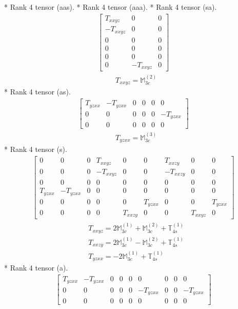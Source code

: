 \documentclass[fleqn,8pt,landscape]{jsarticle}
\begin{document}
* Rank 4 tensor (aas).
* Rank 4 tensor (aaa).
* Rank 4 tensor (sa).
\begin{align*}
\begin{bmatrix} T_{xxyz} & 0 & 0 \\ - T_{xxyz} & 0 & 0 \\ 0 & 0 & 0 \\ 0 & 0 & 0 \\ 0 & 0 & 0 \\ 0 & - T_{xxyz} & 0 \end{bmatrix}
\end{align*}
\begin{align*}
& T_{xxyz} = \mathbb{M}_{3c}^{(2)}
\end{align*}
* Rank 4 tensor (as).
\begin{align*}
\begin{bmatrix} T_{yzxx} & - T_{yzxx} & 0 & 0 & 0 & 0 \\ 0 & 0 & 0 & 0 & 0 & - T_{yzxx} \\ 0 & 0 & 0 & 0 & 0 & 0 \end{bmatrix}
\end{align*}
\begin{align*}
& T_{yzxx} = \mathbb{M}_{3c}^{(3)}
\end{align*}
* Rank 4 tensor (s).
\begin{align*}
\begin{bmatrix} 0 & 0 & 0 & T_{xxyz} & 0 & 0 & T_{xxzy} & 0 & 0 \\ 0 & 0 & 0 & - T_{xxyz} & 0 & 0 & - T_{xxzy} & 0 & 0 \\ 0 & 0 & 0 & 0 & 0 & 0 & 0 & 0 & 0 \\ T_{yzxx} & - T_{yzxx} & 0 & 0 & 0 & 0 & 0 & 0 & 0 \\ 0 & 0 & 0 & 0 & 0 & T_{yzxx} & 0 & 0 & T_{yzxx} \\ 0 & 0 & 0 & 0 & T_{xxzy} & 0 & 0 & T_{xxyz} & 0 \end{bmatrix}
\end{align*}
\begin{align*}
& T_{xxyz} = 2 \mathbb{M}_{3c}^{(1)} + \mathbb{M}_{3c}^{(2)} + \mathbb{T}_{4s}^{(1)} \\
& T_{xxzy} = 2 \mathbb{M}_{3c}^{(1)} - \mathbb{M}_{3c}^{(2)} + \mathbb{T}_{4s}^{(1)} \\
& T_{yzxx} = - 2 \mathbb{M}_{3c}^{(1)} + \mathbb{T}_{4s}^{(1)}
\end{align*}
* Rank 4 tensor (a).
\begin{align*}
\begin{bmatrix} T_{yzxx} & - T_{yzxx} & 0 & 0 & 0 & 0 & 0 & 0 & 0 \\ 0 & 0 & 0 & 0 & 0 & - T_{yzxx} & 0 & 0 & - T_{yzxx} \\ 0 & 0 & 0 & 0 & 0 & 0 & 0 & 0 & 0 \end{bmatrix}
\end{align*}
\end{document}
